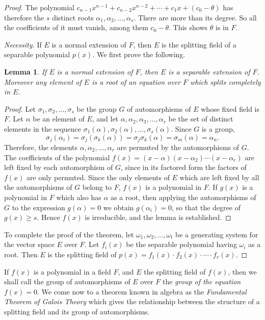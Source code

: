 \documentclass[11pt]{article}
\newtheorem*{lemm}{Lemma}
\theoremstyle{definition}
\begin{document}
\begin{proof}
The polynomial $c_{n-1}x^{n-1} + c_{n-2}x^{n-2} + \cdots + c_1 x + (c_0 - \theta)$ has therefore the $s$ distinct roots $\alpha_1,\alpha_2,\ldots,\alpha_s$.
There are more than its degree.
So all the coefficients of it must vanish, among them $c_0 - \theta$.
This shows $\theta$ is in $F$.

\emph{Necessity.}\quad
If $E$ is a normal extension of $F$, then $E$ is the splitting field of a separable polynomial $p(x)$.
We first prove the following.

\begin{lemm}
If $E$ is a normal extension of $F$, then $E$ is a separable extension of $F$.
Moreover any element of $E$ is a root of an equation over $F$ which splits completely in $E$.
\end{lemm}

\begin{proof}
Let $\sigma_1,\sigma_2, \ldots,\sigma_s$ be the group $G$ of automorphisms of $E$ whose fixed field is $F$.
Let $\alpha$ be an element of $E$, and let $\alpha, \alpha_2, \alpha_3, \ldots, \alpha_r$ be the set of distinct elements in the sequence $\sigma_1(\alpha), \sigma_2(\alpha), \ldots, \sigma_s(\alpha)$.
Since $G$ is a group,
\[
\sigma_j(\alpha_i)
= \sigma_j(\sigma_k(\alpha))
= \sigma_j \sigma_k(\alpha)
= \sigma_m(\alpha)
= \alpha_n.
\]
Therefore, the elements $\alpha, \alpha_2, \ldots, \alpha_r$ are permuted by the automorphisms of $G$.
The coefficients of the polynomial $f(x) = (x-\alpha)(x-\alpha_2) \cdots (x-\alpha_r)$ are left fixed by each automorphism of $G$, since in its factored form the factors of $f(x)$ are only permuted.
Since the only elements of $E$ which are left fixed by all the automorphisms of $G$ belong to $F$, $f(x)$ is a polynomial in $F$.
If $g(x)$ is a polynomial in $F$ which also has $\alpha$ as a root, then applying the automorphisms of $G$ to the expression $g(\alpha) = 0$ we obtain $g(\alpha_i) = 0$, so that the degree of $g(x) \geq s$.
Hence $f(x)$ is irreducible, and the lemma is established.
\end{proof}

To complete the proof of the theorem, let $\omega_1,\omega_2, \ldots, \omega_t$ be a generating system for the vector space $E$ over $F$.
Let $f_i(x)$ be the separable polynomial having $\omega_i$ as a root.
Then $E$ is the splitting field of $p(x) = f_1(x) \cdot f_2(x) \cdot \cdots \cdot f_r(x)$.
\end{proof}


If $f(x)$ is a polynomial in a field $F$, and $E$ the splitting field of $f(x)$, then we shall call the group of automorphisms of $E$ over $F$ the \emph{group of the equation $f(x) = 0$}.
We come now to a theorem known in algebra as the \emph{Fundamental Theorem of Galois Theory} which gives the relationship between the structure of a splitting field and its group of automorphisms.
\end{document}
